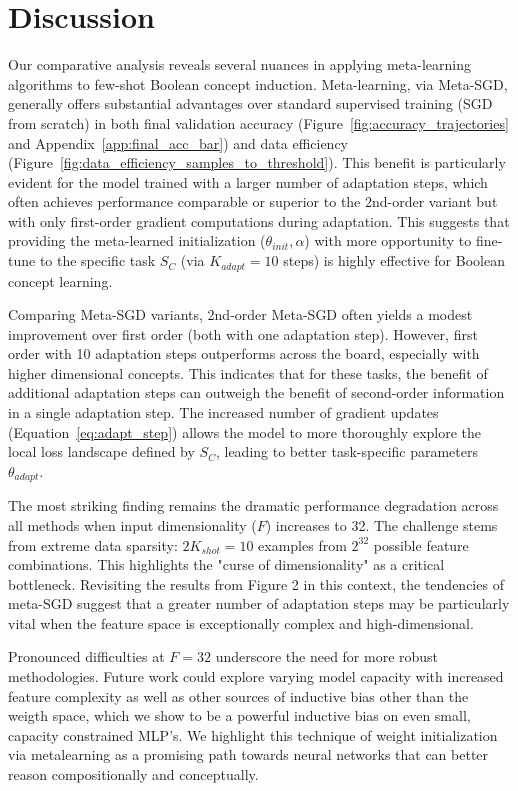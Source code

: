 \documentclass{article}
\begin{document}
\section{Discussion}\label{sec:discussion}
Our comparative analysis reveals several nuances in applying meta-learning algorithms to few-shot Boolean concept induction. Meta-learning, via Meta-SGD, generally offers substantial advantages over standard supervised training (SGD from scratch) in both final validation accuracy (Figure~\ref{fig:accuracy_trajectories} and Appendix~\ref{app:final_acc_bar}) and data efficiency (Figure~\ref{fig:data_efficiency_samples_to_threshold}). This benefit is particularly evident for the model trained with a larger number of adaptation steps, which often achieves performance comparable or superior to the 2nd-order variant but with only first-order gradient computations during adaptation. This suggests that providing the meta-learned initialization ($\theta_{init}, \alpha$) with more opportunity to fine-tune to the specific task $S_C$ (via $K_{adapt}=10$ steps) is highly effective for Boolean concept learning.

Comparing Meta-SGD variants, 2nd-order Meta-SGD often yields a modest improvement over first order (both with one adaptation step). However, first order with 10 adaptation steps outperforms across the board, especially with higher dimensional concepts. This indicates that for these tasks, the benefit of additional adaptation steps can outweigh the benefit of second-order information in a single adaptation step. The increased number of gradient updates (Equation~\ref{eq:adapt_step}) allows the model to more thoroughly explore the local loss landscape defined by $S_C$, leading to better task-specific parameters $\theta_{adapt}$.

The most striking finding remains the dramatic performance degradation across all methods when input dimensionality ($F$) increases to 32. The challenge stems from extreme data sparsity: $2K_{shot}=10$ examples from $2^{32}$ possible feature combinations. This highlights the "curse of dimensionality" as a critical bottleneck. Revisiting the results from Figure 2 in this context, the tendencies of meta-SGD suggest that a greater number of adaptation steps may be particularly vital when the feature space is exceptionally complex and high-dimensional. 

Pronounced difficulties at $F=32$ underscore the need for more robust methodologies. Future work could explore varying model capacity with increased feature complexity as well as other sources of inductive bias other than the weigth space, which we show to be a powerful inductive bias on even small, capacity constrained MLP's. We highlight this technique of weight initialization via metalearning as a promising path towards neural networks that can better reason compositionally and conceptually. 
\end{document}

